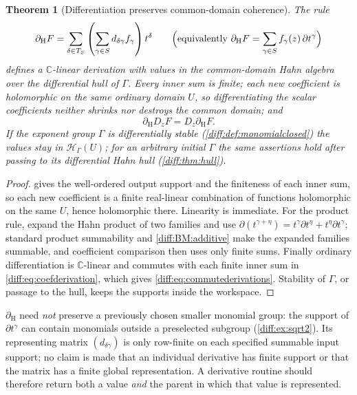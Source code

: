 \documentclass[11pt,letterpaper]{article}
\numberwithin{equation}{section}
\newtheorem{theorem}{Theorem}[section]
\theoremstyle{definition}
\theoremstyle{remark}
\newcommand{\C}{\mathbb C}
\newcommand{\der}{\partial}
\newcommand{\Hring}{\mathscr H}
\newcommand{\dercoef}{\der_{\mathrm H}}
\newcommand{\Dz}{D_{z}}
\begin{document}
\begin{theorem}[Differentiation preserves common-domain coherence]
\label{diff:thm:coefderivation}
The rule
\begin{equation}\label{diff:eq:coefderivation}
 \dercoef F
 =\sum_{\delta\in T_{S}}
 \left(\sum_{\gamma\in S}d_{\delta\gamma}f_{\gamma}\right)t^{\delta}
 \qquad\Bigl(\text{equivalently }
 \dercoef F=\sum_{\gamma\in S}f_{\gamma}(z)\,\der t^{\gamma}\Bigr)
\end{equation}
defines a $\C$-linear derivation with values in the common-domain Hahn
algebra over the differential hull of $\Gamma$. Every
inner sum is finite; each new coefficient is holomorphic on the \emph{same}
ordinary domain $U$, so differentiating the scalar coefficients neither
shrinks nor destroys the common domain; and
\begin{equation}\label{diff:eq:commutederivations}
 \dercoef\Dz F=\Dz\dercoef F .
\end{equation}
If the exponent group $\Gamma$ is differentially stable
(\cref{diff:def:monomialclosed}) the values stay in
$\Hring_{\Gamma}(U)$; for an arbitrary initial $\Gamma$ the same assertions
hold after passing to its differential Hahn hull (\cref{diff:thm:hull}).
\end{theorem}
\begin{proof}
 gives the well-ordered output support and the
finiteness of each inner sum, so each new coefficient is a finite real-linear
combination of functions holomorphic on the same $U$, hence holomorphic there.
Linearity is immediate. For the product rule, expand the Hahn product of two
families and use $\der(t^{\gamma+\eta})=t^{\gamma}\der t^{\eta}+t^{\eta}\der t^{\gamma}$;
standard product summability and \ref{diff:BM:additive} make the expanded
families summable, and coefficient comparison then uses only finite sums.
Finally ordinary differentiation is $\C$-linear and commutes with each finite
inner sum in \cref{diff:eq:coefderivation}, which gives
\cref{diff:eq:commutederivations}. Stability of $\Gamma$, or passage to the
hull, keeps the supports inside the workspace.
\end{proof}

\begin{warning}
\label{diff:warn:largerworkspace}
$\dercoef$ need \emph{not} preserve a previously chosen smaller monomial
group: the support of $\der t^{\gamma}$ can contain monomials outside a
preselected subgroup (\cref{diff:ex:sqrt2}). Its representing matrix
$(d_{\delta\gamma})$ is only row-finite on each specified summable input
support; no claim is made that an individual derivative has finite support or
that the matrix has a finite global representation. A derivative routine
should therefore return both a value \emph{and} the parent in which that value
is represented.
\end{warning}
\end{document}
